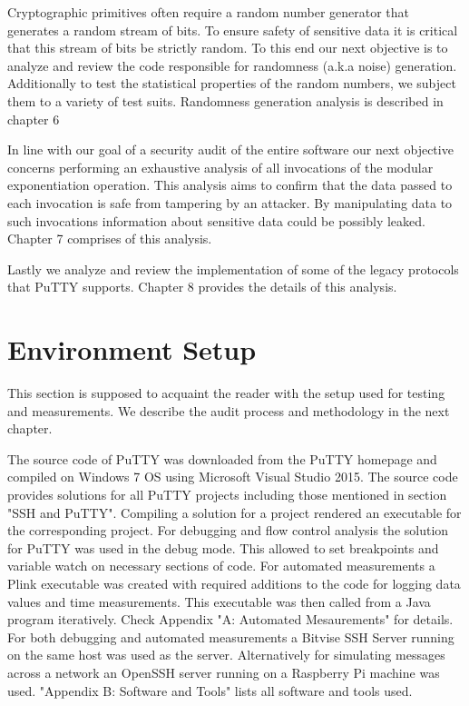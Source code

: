 \documentclass{report}
\begin{document}
Cryptographic primitives often require a random number generator that generates a random stream of bits. To ensure safety of sensitive data it is critical that this stream of bits be strictly random. To this end our next objective is to analyze and review the code responsible for randomness (a.k.a noise) generation. Additionally to test the statistical properties of the random numbers, we subject them to a variety of test suits. Randomness generation analysis is described in chapter 6\par
In line with our goal of a security audit of the entire software our next objective concerns performing an exhaustive analysis of all invocations of the modular exponentiation operation. This analysis aims to confirm that the data passed to each invocation is safe from tampering by an attacker. By manipulating data to such invocations information about sensitive data could be possibly leaked. Chapter 7 comprises of this analysis.\par
Lastly we analyze and review the implementation of some of the legacy protocols that PuTTY supports. Chapter 8 provides the details of this analysis.\par
\section{Environment Setup}
This section is supposed to acquaint the reader with the setup used for testing and measurements. We describe the audit process and methodology in the next chapter.\par

The source code of PuTTY was downloaded from the PuTTY homepage \cite{putty} and compiled on Windows 7 OS using Microsoft Visual Studio 2015. The source code provides solutions for all PuTTY projects including those mentioned in section "SSH and PuTTY". Compiling a solution for a project rendered an executable for the corresponding project. For debugging and flow control analysis the solution for PuTTY was used in the debug mode. This allowed to set breakpoints and variable watch on necessary sections of code. For automated measurements a Plink executable was created with required additions to the code for logging data values and time measurements. This executable was then called from a Java program iteratively. Check Appendix "A: Automated Mesaurements" for details. For both debugging and automated measurements a Bitvise SSH Server running on the same host was used as the server. Alternatively for simulating messages across a network an OpenSSH server running on a Raspberry Pi machine was used.
"Appendix B: Software and Tools" lists all software and tools used.
\end{document}
